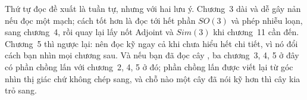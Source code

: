 \documentclass[../vslam.tex]{subfiles}
\begin{document}
Thứ tự đọc đề xuất là tuần tự, nhưng với hai lưu ý. Chương~3 dài và dễ gây nản nếu đọc một mạch; cách tốt hơn là đọc tới hết phần \(SO(3)\) và phép nhiễu loạn, sang chương~4, rồi quay lại lấy nốt Adjoint và \(Sim(3)\) khi chương~11 cần đến. Chương~5 thì ngược lại: nên đọc kỹ ngay cả khi chưa hiểu hết chi tiết, vì nó đổi cách bạn nhìn mọi chương sau. Và nếu bạn đã đọc cây , ba chương~3, 4, 5 ở đây có phần chồng lấn với chương~2, 4, 5 ở đó; phần chồng lấn được viết lại từ góc nhìn thị giác chứ không chép sang, và chỗ nào một cây đã nói kỹ hơn thì cây kia trỏ sang.







\ifSubfilesClassLoaded{\printbibliography[title={Nguồn}]}{}
\end{document}
